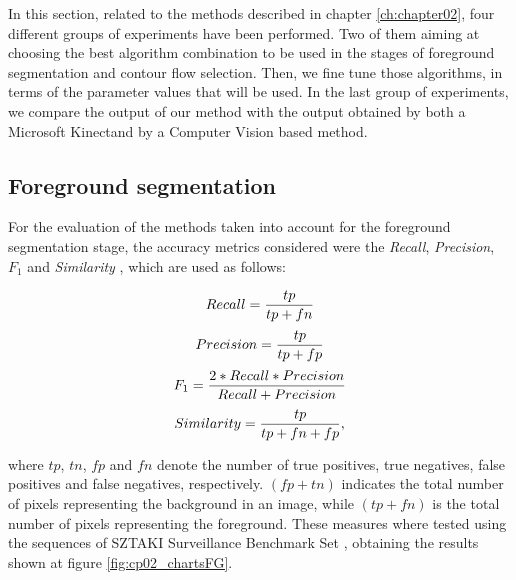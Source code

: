 In this section, related to the methods described in chapter \ref{ch:chapter02}, four different groups of experiments have been performed. Two of them aiming at choosing the best algorithm combination to be used in the stages of foreground segmentation and contour flow selection. Then, we fine tune those algorithms, in terms of the parameter values that will be used. In the last group of experiments, we compare the output of our method with the output obtained by both a Microsoft Kinect\textregistered and by a Computer Vision based method.

\subsection{Foreground segmentation}\label{ch:chapter02_02_01}

For the evaluation of the methods taken into account for the foreground segmentation stage, the accuracy metrics considered were the \textit{Recall}, \textit{Precision}, \textit{$F_1$} and \textit{Similarity} \citep{maddalena2008self}, which are used as follows:

\begin{equation}\label{eq_Recall}
Recall = { tp \over { tp + fn } }
\end{equation}
\begin{equation}\label{eq_Precision}
Precision = { tp \over { tp + fp } }
\end{equation}
\begin{equation}\label{eq_F1}
F_1 = { {2 * Recall * Precision} \over {Recall + Precision} }
\end{equation}
\begin{equation}\label{eq_Similarity}
Similarity = { tp \over { tp + fn + fp } },
\end{equation}

where $tp$, $tn$, $fp$ and $fn$ denote the number of true positives, true negatives, false positives and false negatives, respectively. $(fp + tn)$ indicates the total number of pixels representing the background in an image, while $(tp + fn)$ is the total number of pixels representing the foreground.
These measures where tested using the sequences of SZTAKI Surveillance Benchmark Set \citep{benedek2008bayesian}, obtaining the results shown at figure \ref{fig:cp02_chartsFG}.

